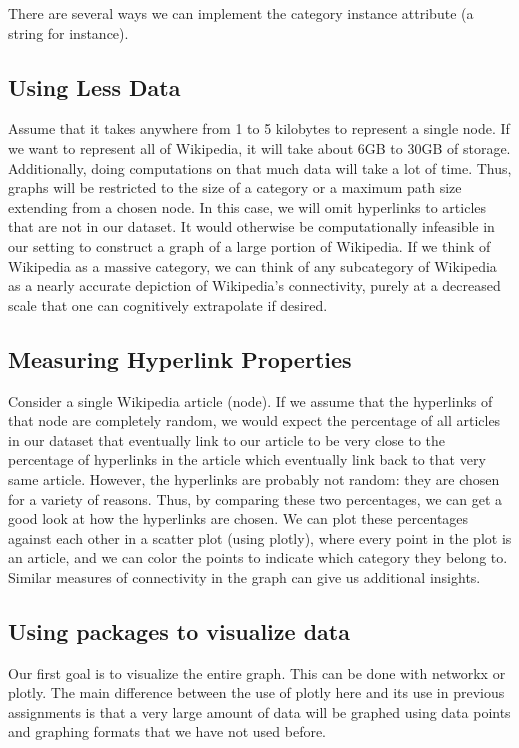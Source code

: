 \documentclass[fontsize=11pt]{article}
\begin{document}
There are several ways we can implement the category instance attribute (a string for instance). 

\subsection*{Using Less Data}

Assume that it takes anywhere from 1 to 5 kilobytes to represent a single node. If we want to represent all of Wikipedia, it will take about 6GB to 30GB of storage. Additionally, doing computations on that much data will take a lot of time. Thus, graphs will be restricted to the size of a category or a maximum path size extending from a chosen node.  In this case, we will omit hyperlinks to articles that are not in our dataset. It would otherwise be computationally infeasible in our setting to construct a graph of a large portion of Wikipedia. If we think of Wikipedia as a massive category, we can think of any subcategory of Wikipedia as a nearly accurate depiction of Wikipedia's connectivity, purely at a decreased scale that one can cognitively extrapolate if desired.

\subsection*{Measuring Hyperlink Properties}
Consider a single Wikipedia article (node). If we assume that the hyperlinks of that node are completely random, we would expect the percentage of all articles in our dataset that eventually link to our article to be very close to the percentage of hyperlinks in the article which eventually link back to that very same article. However, the hyperlinks are probably not random: they are chosen for a variety of reasons. Thus, by comparing these two percentages, we can get a good look at how the hyperlinks are chosen. We can plot these percentages against each other in a scatter plot (using plotly), where every point in the plot is an article, and we can color the points to indicate which category they belong to. Similar measures of connectivity in the graph can give us additional insights. 

\subsection*{Using packages to visualize data}
Our first goal is to visualize the entire graph. This can be done with networkx or plotly. The main difference between the use of plotly here and its use in previous assignments is that a very large amount of data will be graphed using data points and graphing formats that we have not used before. 
\end{document}
